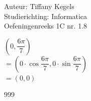 \documentclass[a4paper]{article}
\begin{document}
  
\noindent \large Auteur: Tiffany Kegels \\
\noindent \large Studierichting: Informatica\\
\noindent \large Oefeningenreeks 1C nr. 1.8\\

\medskip

\normalsize

$\left( 0, \dfrac{6\pi}{7}\right)$\\

$=\left( 0 \cdot \cos \dfrac{6\pi}{7}, 0 \cdot \sin \dfrac{6\pi}{7} \right)$\\

$= (0,0)$


\begin{thebibliography}{999}

\end{thebibliography}
\end{document}
